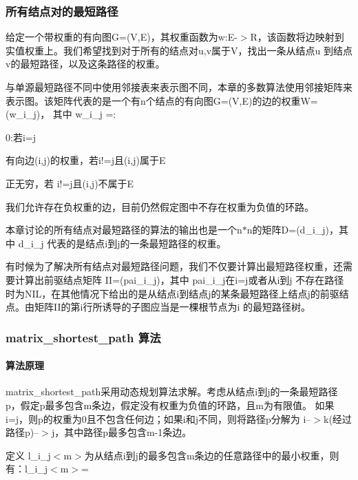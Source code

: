 \subsubsection*{所有结点对的最短路径}

给定一个带权重的有向图\+G=(V,E)，其权重函数为w\+:E-\/$>$R，该函数将边映射到实值权重上。我们希望找到对于所有的结点对u,v属于\+V，找出一条从结点u 到结点v的最短路径，以及这条路径的权重。

与单源最短路径不同中使用邻接表来表示图不同，本章的多数算法使用邻接矩阵来表示图。该矩阵代表的是一个有n个结点的有向图\+G=(V,E)的边的权重\+W=(w\+\_\+i\+\_\+j)， 其中 w\+\_\+i\+\_\+j =\+:


\begin{DoxyItemize}
\item 0\+:若i=j
\item 有向边(i,j)的权重，若i!=j且(i,j)属于\+E
\item 正无穷，若 i!=j且(i,j)不属于\+E
\end{DoxyItemize}

我们允许存在负权重的边，目前仍然假定图中不存在权重为负值的环路。

本章讨论的所有结点对最短路径的算法的输出也是一个n$\ast$n的矩阵\+D=(d\+\_\+i\+\_\+j)，其中 d\+\_\+i\+\_\+j 代表的是结点i到j的一条最短路径的权重。

有时候为了解决所有结点对最短路径问题，我们不仅要计算出最短路径权重，还需要计算出前驱结点矩阵 I\+I=(pai\+\_\+i\+\_\+j)，其中 pai\+\_\+i\+\_\+j在i=j或者从i到j 不存在路径时为\+N\+I\+L，在其他情况下给出的是从结点i到结点j的某条最短路径上结点j的前驱结点。由矩阵\+I\+I的第i行所诱导的子图应当是一棵根节点为i 的最短路径树。

\subsubsection*{matrix\+\_\+shortest\+\_\+path 算法}

\paragraph*{算法原理}

matrix\+\_\+shortest\+\_\+path采用动态规划算法求解。考虑从结点i到j的一条最短路径p，假定p最多包含m条边，假定没有权重为负值的环路，且m为有限值。 如果 i=j，则p的权重为0且不包含任何边；如果i和j不同，则将路径p分解为 i--$>$k(经过路径p\textquotesingle{})--$>$j，其中路径p\textquotesingle{}最多包含m-\/1条边。

定义 l\+\_\+i\+\_\+j$<$m$>$为从结点i到j的最多包含m条边的任意路径中的最小权重，则有：l\+\_\+i\+\_\+j$<$m$>$=


